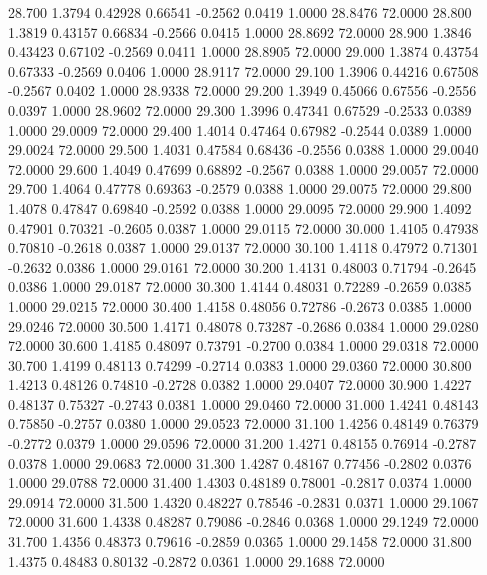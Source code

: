   28.700   1.3794   0.42928   0.66541  -0.2562   0.0419   1.0000  28.8476  72.0000
  28.800   1.3819   0.43157   0.66834  -0.2566   0.0415   1.0000  28.8692  72.0000
  28.900   1.3846   0.43423   0.67102  -0.2569   0.0411   1.0000  28.8905  72.0000
  29.000   1.3874   0.43754   0.67333  -0.2569   0.0406   1.0000  28.9117  72.0000
  29.100   1.3906   0.44216   0.67508  -0.2567   0.0402   1.0000  28.9338  72.0000
  29.200   1.3949   0.45066   0.67556  -0.2556   0.0397   1.0000  28.9602  72.0000
  29.300   1.3996   0.47341   0.67529  -0.2533   0.0389   1.0000  29.0009  72.0000
  29.400   1.4014   0.47464   0.67982  -0.2544   0.0389   1.0000  29.0024  72.0000
  29.500   1.4031   0.47584   0.68436  -0.2556   0.0388   1.0000  29.0040  72.0000
  29.600   1.4049   0.47699   0.68892  -0.2567   0.0388   1.0000  29.0057  72.0000
  29.700   1.4064   0.47778   0.69363  -0.2579   0.0388   1.0000  29.0075  72.0000
  29.800   1.4078   0.47847   0.69840  -0.2592   0.0388   1.0000  29.0095  72.0000
  29.900   1.4092   0.47901   0.70321  -0.2605   0.0387   1.0000  29.0115  72.0000
  30.000   1.4105   0.47938   0.70810  -0.2618   0.0387   1.0000  29.0137  72.0000
  30.100   1.4118   0.47972   0.71301  -0.2632   0.0386   1.0000  29.0161  72.0000
  30.200   1.4131   0.48003   0.71794  -0.2645   0.0386   1.0000  29.0187  72.0000
  30.300   1.4144   0.48031   0.72289  -0.2659   0.0385   1.0000  29.0215  72.0000
  30.400   1.4158   0.48056   0.72786  -0.2673   0.0385   1.0000  29.0246  72.0000
  30.500   1.4171   0.48078   0.73287  -0.2686   0.0384   1.0000  29.0280  72.0000
  30.600   1.4185   0.48097   0.73791  -0.2700   0.0384   1.0000  29.0318  72.0000
  30.700   1.4199   0.48113   0.74299  -0.2714   0.0383   1.0000  29.0360  72.0000
  30.800   1.4213   0.48126   0.74810  -0.2728   0.0382   1.0000  29.0407  72.0000
  30.900   1.4227   0.48137   0.75327  -0.2743   0.0381   1.0000  29.0460  72.0000
  31.000   1.4241   0.48143   0.75850  -0.2757   0.0380   1.0000  29.0523  72.0000
  31.100   1.4256   0.48149   0.76379  -0.2772   0.0379   1.0000  29.0596  72.0000
  31.200   1.4271   0.48155   0.76914  -0.2787   0.0378   1.0000  29.0683  72.0000
  31.300   1.4287   0.48167   0.77456  -0.2802   0.0376   1.0000  29.0788  72.0000
  31.400   1.4303   0.48189   0.78001  -0.2817   0.0374   1.0000  29.0914  72.0000
  31.500   1.4320   0.48227   0.78546  -0.2831   0.0371   1.0000  29.1067  72.0000
  31.600   1.4338   0.48287   0.79086  -0.2846   0.0368   1.0000  29.1249  72.0000
  31.700   1.4356   0.48373   0.79616  -0.2859   0.0365   1.0000  29.1458  72.0000
  31.800   1.4375   0.48483   0.80132  -0.2872   0.0361   1.0000  29.1688  72.0000
